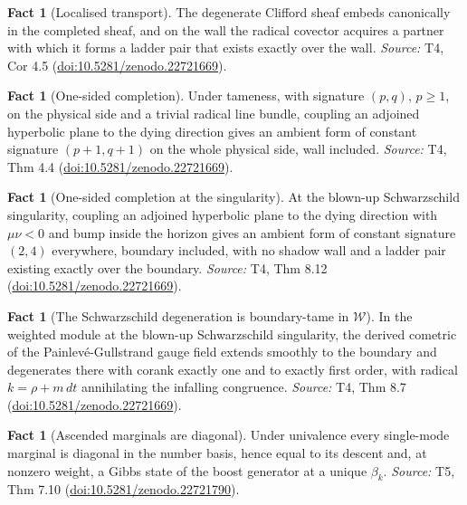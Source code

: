 \documentclass[11pt]{article}
\theoremstyle{definition}
\newtheorem{fact}[theorem]{Fact}
\theoremstyle{plain}
\providecommand{\dtPG}{}\renewcommand{\dtPG}{dt}
\providecommand{\shW}{}\renewcommand{\shW}{\mathcal{W}}
\begin{document}
\begin{fact}[Localised transport]\label{c:sheaf.localised-transport}
The degenerate Clifford sheaf embeds canonically in the completed sheaf, and on the wall the radical covector acquires a partner with which it forms a ladder pair that exists exactly over the wall.
\emph{Source:} T4, Cor 4.5 (\href{https://doi.org/10.5281/zenodo.22721669}{doi:10.5281/zenodo.22721669}).
\end{fact}

\begin{fact}[One-sided completion]\label{c:sheaf.one-sided-completion}
Under tameness, with signature $(p,q)$, $p \geq 1$, on the physical side and a trivial radical line bundle, coupling an adjoined hyperbolic plane to the dying direction gives an ambient form of constant signature $(p{+}1, q{+}1)$ on the whole physical side, wall included.
\emph{Source:} T4, Thm 4.4 (\href{https://doi.org/10.5281/zenodo.22721669}{doi:10.5281/zenodo.22721669}).
\end{fact}

\begin{fact}[One-sided completion at the singularity]\label{c:sheaf.one-sided-completion-singularity}
At the blown-up Schwarzschild singularity, coupling an adjoined hyperbolic plane to the dying direction with $\mu\nu < 0$ and bump inside the horizon gives an ambient form of constant signature $(2,4)$ everywhere, boundary included, with no shadow wall and a ladder pair existing exactly over the boundary.
\emph{Source:} T4, Thm 8.12 (\href{https://doi.org/10.5281/zenodo.22721669}{doi:10.5281/zenodo.22721669}).
\end{fact}

\begin{fact}[The Schwarzschild degeneration is boundary-tame in $\shW$]\label{c:sheaf.schwarzschild-degeneration-boundary-tame}
In the weighted module at the blown-up Schwarzschild singularity, the derived cometric of the Painlev\'e-Gullstrand gauge field extends smoothly to the boundary and degenerates there with corank exactly one and to exactly first order, with radical $k = \rho + m\,\dtPG$ annihilating the infalling congruence.
\emph{Source:} T4, Thm 8.7 (\href{https://doi.org/10.5281/zenodo.22721669}{doi:10.5281/zenodo.22721669}).
\end{fact}

\begin{fact}[Ascended marginals are diagonal]\label{c:singularity.ascended-marginals-are-diagonal}
Under univalence every single-mode marginal is diagonal in the number basis, hence equal to its descent and, at nonzero weight, a Gibbs state of the boost generator at a unique $\beta_k$.
\emph{Source:} T5, Thm 7.10 (\href{https://doi.org/10.5281/zenodo.22721790}{doi:10.5281/zenodo.22721790}).
\end{fact}
\end{document}
